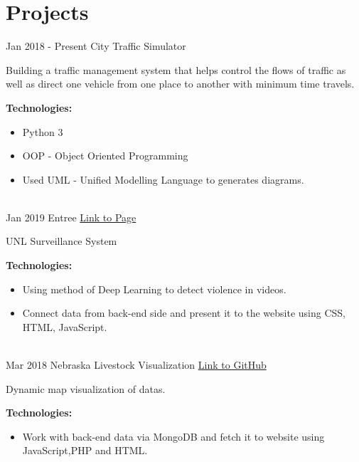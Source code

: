 \documentclass[letterpaper]{twentysecondcv} %
\begin{document}
\section{Projects}
\begin{twenty}
	\twentyitem
    	{Jan 2018 - }
		{Present}
        {City Traffic Simulator}
        {} %
        {}
        {
       	Building a traffic management system that helps control the flows of traffic as well as direct one vehicle from one place to another with minimum time travels.
       	
       	\textbf{Technologies:}
        {\begin{itemize}
        \item Python 3
        \item OOP - Object Oriented Programming
        \item Used UML - Unified Modelling Language to generates diagrams.
		\end{itemize}}
        }
    \\
        \twentyitem
    	{Jan 2019}
		{}
        {Entree}
        {\href{https://datduyng.github.io/cornhack2019/}{Link to Page}} %
        {}
        {
       	UNL Surveillance System
       	
       	\textbf{Technologies:}
        {\begin{itemize}
        \item Using method of Deep Learning to detect violence in videos.
        \item Connect data from back-end side and present it to the website using CSS, HTML, JavaScript.
		\end{itemize}}
        }
        \\
    \twentyitem
    	{Mar 2018}
		{}
        {Nebraska Livestock Visualization}
        {\href{https://github.com/HuyNVuong/Nebraska-livestock-Visualisation}{Link to GitHub}} %
        {}
        {
       	Dynamic map visualization of datas.
       	
       	\textbf{Technologies:}
        {\begin{itemize}
        \item Work with back-end data via MongoDB and fetch it to website using JavaScript,PHP and HTML.
		\end{itemize}}
        }

\end{twenty}
\end{document}
